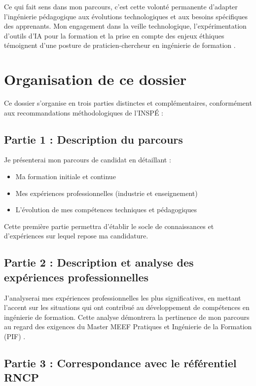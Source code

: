 Ce qui fait sens dans mon parcours, c'est cette volonté permanente d'adapter l'ingénierie pédagogique aux évolutions technologiques et aux besoins spécifiques des apprenants. Mon engagement dans la veille technologique, l'expérimentation d'outils d'IA pour la formation et la prise en compte des enjeux éthiques témoignent d'une posture de praticien-chercheur en ingénierie de formation \parencite{perrenoud_pratique_reflexive}.

\section{Organisation de ce dossier}

Ce dossier s'organise en trois parties distinctes et complémentaires, conformément aux recommandations méthodologiques de l'INSPÉ \parencite{vademecum_vae_inspe} :

\subsection*{Partie 1 : Description du parcours}

Je présenterai mon parcours de candidat en détaillant :
\begin{itemize}[leftmargin=*]
    \item Ma formation initiale et continue
    \item Mes expériences professionnelles (industrie et enseignement)
    \item L'évolution de mes compétences techniques et pédagogiques
\end{itemize}

Cette première partie permettra d'établir le socle de connaissances et d'expériences sur lequel repose ma candidature.

\subsection*{Partie 2 : Description et analyse des expériences professionnelles}

J'analyserai mes expériences professionnelles les plus significatives, en mettant l'accent sur les situations qui ont contribué au développement de compétences en ingénierie de formation. Cette analyse démontrera la pertinence de mon parcours au regard des exigences du Master MEEF Pratiques et Ingénierie de la Formation (PIF) \parencite{rncp38152}.

\subsection*{Partie 3 : Correspondance avec le référentiel RNCP}

